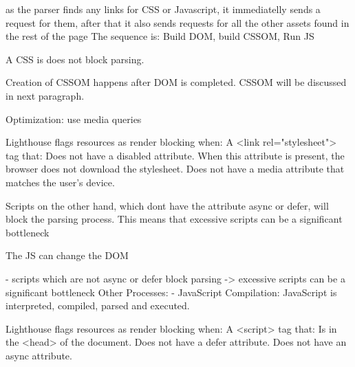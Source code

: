 as the parser finds any links for CSS or Javascript, it immediatelly sends a request for them, after that it also sends requests for all the other assets found in the rest of the page
The sequence is: Build DOM, build CSSOM, Run JS







A CSS is does not block parsing. %

Creation of CSSOM happens after DOM is completed. %
CSSOM will be discussed in next paragraph.


Optimization: use media queries


Lighthouse flags resources as render blocking when:
A <link rel="stylesheet"> tag that:
Does not have a disabled attribute. When this attribute is present, the browser does not download the stylesheet.
Does not have a media attribute that matches the user's device.






Scripts on the other hand, which dont have the attribute async or defer, will block the parsing process.
This means that excessive scripts can be a significant bottleneck %


The JS can change the DOM %


- scripts which are not async or defer block parsing -> excessive scripts can be a significant bottleneck
Other Processes:
- JavaScript Compilation: JavaScript is interpreted, compiled, parsed and executed.



Lighthouse flags resources as render blocking when:
A <script> tag that:
Is in the <head> of the document.
Does not have a defer attribute.
Does not have an async attribute.





